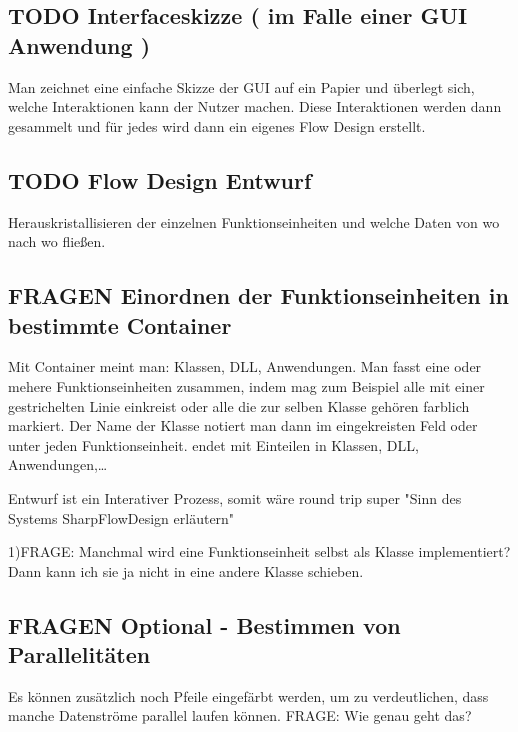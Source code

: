 \documentclass[11pt]{article}
\begin{document}
\subsection{{\bfseries\sffamily TODO} Interfaceskizze ( im Falle einer GUI Anwendung )}
\label{sec:orgheadline66}
Man zeichnet eine einfache Skizze der GUI auf ein Papier und überlegt sich, welche Interaktionen kann der Nutzer machen.
Diese Interaktionen werden dann gesammelt und für jedes wird dann ein eigenes Flow Design erstellt.

\subsection{{\bfseries\sffamily TODO} Flow Design Entwurf}
\label{sec:orgheadline67}
Herauskristallisieren der einzelnen Funktionseinheiten und welche Daten von wo nach wo fließen.

\subsection{{\bfseries\sffamily FRAGEN} Einordnen der Funktionseinheiten in bestimmte Container}
\label{sec:orgheadline68}

Mit Container meint man: Klassen, DLL, Anwendungen.
Man fasst eine oder mehere Funktionseinheiten zusammen, indem mag zum Beispiel alle mit einer gestrichelten Linie einkreist oder alle die zur selben Klasse
gehören farblich markiert. Der Name der Klasse notiert man dann im eingekreisten Feld oder unter jeden Funktionseinheit.
  endet mit Einteilen in Klassen, DLL, Anwendungen,\ldots{}

Entwurf ist ein Interativer Prozess, somit wäre round trip super "Sinn des Systems SharpFlowDesign erläutern"

1)FRAGE: Manchmal wird eine Funktionseinheit selbst als Klasse implementiert? Dann kann ich sie ja nicht in eine andere Klasse schieben.

\subsection{{\bfseries\sffamily FRAGEN} Optional - Bestimmen von Parallelitäten}
\label{sec:orgheadline69}
Es können zusätzlich noch Pfeile eingefärbt werden, um zu verdeutlichen, dass
manche Datenströme parallel laufen können.
FRAGE: Wie genau geht das?
\end{document}
